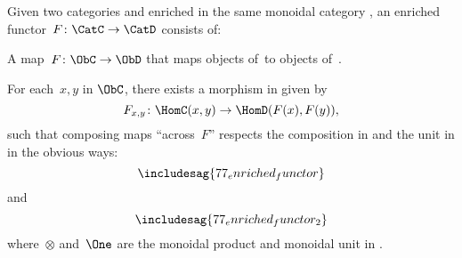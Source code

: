 \begin{ctdefinition}
    \label{defn:enrichedfunctor}
    Given two categories \CatC and \CatD enriched in the same monoidal category \CatV, an enriched functor~$F\colon \CatC \to \CatD$ consists of:
    \begin{compactenum}
        \item A map~$F\colon \ObC \to \ObD$ that maps objects of~\CatC to objects of~\CatD.
        \item For each~$x, y$ in $\ObC$, there exists a morphism in \CatV given by
        \begin{equation}
            F_{x,y} \colon \HomC(x,y) \to \HomD(F(x), F(y)),
        \end{equation}
        such that composing maps ``across~$F$'' respects the composition in \CatC and the unit in \CatV in the obvious ways:
        \begin{equation}
            \includesag{77_enriched_functor}
        \end{equation}
        and
        \begin{equation}
            \includesag{77_enriched_functor_2}
        \end{equation}
        where~$\otimes$ and~$\One$ are the monoidal product and monoidal unit in \CatV.
    \end{compactenum}
\end{ctdefinition}

